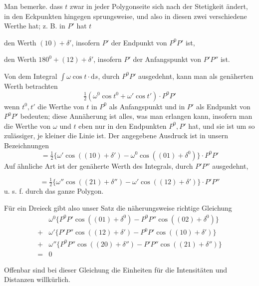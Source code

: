 Man bemerke. dass $t$ zwar in jeder Polygonseite sich nach der Stetigkeit ändert, in den Eckpunkten hingegen sprungsweise, und also in diesen zwei verschiedene Werthe hat; z. B. in $P'$ hat $t$

den Werth $(10)+\delta'$, insofern $P'$ der Endpunkt von $P^0P'$ ist,

den Werth $180^0+(12)+\delta'$, insofern $P'$ der Anfangspunkt von $P'P''$ ist.

Von dem Integral $\int\omega\cos t\cdot\mathrm{d}s$, durch $P^0P'$ ausgedehnt, kann man als genäherten Werth betrachten
\[
\tfrac12(\omega^0\cos t^0+\omega'\cos t')\cdot P^0P'
\]
wenn $t^0,t'$ die Werthe von $t$ in $P^0$ als Anfangspunkt und in $P'$ als Endpunkt von $P^0P'$ bedeuten; diese Annäherung ist alles, was man erlangen kann, insofern man die Werthe von $\omega$ und $t$ eben nur in den Endpunkten $P^0,P'$ hat, und sie ist um so zulässiger, je kleiner die Linie ist. Der angegebene Ausdruck ist in unsern Bezeichnungen
\[
=\tfrac12\{\omega'\cos((10)+\delta')-\omega^0\cos((01)+\delta^0)\}\cdot P^0P'
\]
Auf ähnliche Art ist der genäherte Werth des Integrals, durch $P'P''$ ausgedehnt,
\par\GaussVTheoryGathering{17\textsuperscript{*}}
\par\clearpage
{}
\[
=\tfrac12\{\omega''\cos((21)+\delta'')-\omega'\cos((12)+\delta')\}\cdot P'P''
\]
u. s. f. durch das ganze Polygon.

Für ein Dreieck gibt also unser Satz die näherungsweise richtige Gleichung
\[
\begin{aligned}
&\omega^0\{P^0P'\cos((01)+\delta^0)-P^0P''\cos((02)+\delta^0)\}\\
{}+{}&\omega'\{P'P''\cos((12)+\delta')-P^0P'\cos((10)+\delta')\}\\
{}+{}&\omega''\{P^0P''\cos((20)+\delta'')-P'P''\cos((21)+\delta'')\}\\
={}&0
\end{aligned}
\]

Offenbar sind bei dieser Gleichung die Einheiten für die Intensitäten und Distanzen willkürlich.

